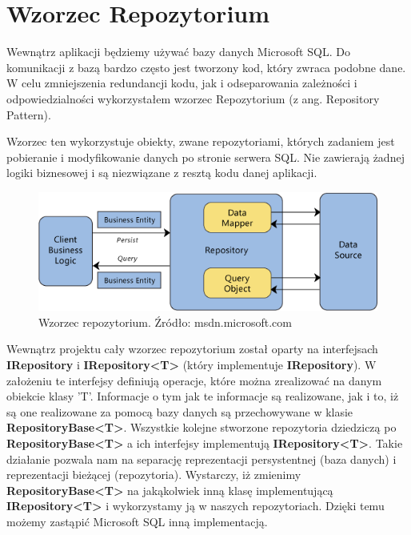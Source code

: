 \section{Wzorzec Repozytorium\cite{RepositoryUnitOfWorkPattern}}

Wewnątrz aplikacji będziemy używać bazy danych Microsoft SQL.
Do komunikacji z bazą bardzo często jest tworzony kod, który zwraca podobne dane. W celu zmniejszenia redundancji kodu, jak i odseparowania zależności i odpowiedzialności wykorzystałem wzorzec Repozytorium (z ang. Repository Pattern).

Wzorzec ten wykorzystuje obiekty, zwane repozytoriami, których zadaniem jest pobieranie i modyfikowanie danych po stronie serwera SQL. Nie zawierają żadnej logiki biznesowej i są niezwiązane z resztą kodu danej aplikacji. 

\begin{figure}[h]
	\centering
	\includegraphics[width=\textwidth]{images/RepositoryPattern.png}
	 \caption{Wzorzec repozytorium. Źródło: msdn.microsoft.com}
\end{figure}


Wewnątrz projektu cały wzorzec repozytorium został oparty na interfejsach \textbf{IRepository} i \textbf{IRepository<T>} (który implementuje \textbf{IRepository}). W założeniu te interfejsy definiują operacje, które można zrealizować na danym obiekcie klasy 'T'. Informacje o tym jak te informacje są realizowane, jak i to, iż są one realizowane za pomocą bazy danych są przechowywane w klasie \textbf{RepositoryBase<T>}.
Wszystkie kolejne stworzone repozytoria dziedziczą po \textbf{RepositoryBase<T>} a ich interfejsy implementują \textbf{IRepository<T>}. 
Takie działanie pozwala nam na separację reprezentacji persystentnej (baza danych) i reprezentacji bieżącej (repozytoria). Wystarczy, iż zmienimy \textbf{RepositoryBase<T>} na jakąkolwiek inną klasę implementującą \textbf{IRepository<T>} i wykorzystamy ją w naszych repozytoriach. Dzięki temu możemy zastąpić Microsoft SQL inną implementacją.



